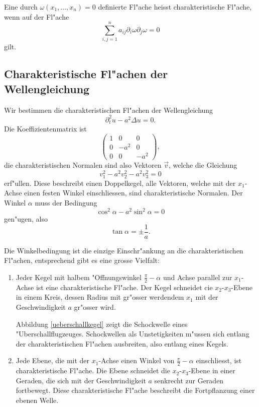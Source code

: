 \begin{definition}
Eine durch $\omega(x_1,\dots,x_n)=0$ definierte Fl"ache heisst
charakteristische Fl"ache, wenn auf der Fl"ache
\[
\sum_{i,j=1}^na_{ij}\partial_i\omega\partial_j\omega=0
\]
gilt.
\end{definition}

\subsection{Charakteristische Fl"achen der Wellengleichung}
Wir bestimmen die charakteristischen Fl"achen der
Wellengleichung
\[
\partial_t^2u-a^2\Delta u=0.
\]
Die Koeffizientenmatrix ist
\[
\begin{pmatrix}
1&0&0\\
0&-a^2&0\\
0&0&-a^2
\end{pmatrix},
\]
die charakteristischen Normalen sind also Vektoren $\vec v$, welche die
Gleichung
\[
v_1^2-a^2v_2^2-a^2v_3^2=0
\]
erf"ullen. Diese beschreibt einen Doppelkegel, alle Vektoren, welche mit
der $x_1$-Achse einen festen Winkel einschliessen, sind charakteristische
Normalen. Der Winkel $\alpha$ muss der Bedingung
\[
\cos^2\alpha-a^2\sin^2\alpha=0
\]
gen"ugen, also
\[
\tan\alpha=\pm\frac1a.
\]

Die Winkelbedingung ist die einzige Einschr"ankung an
die charakteristischen Fl"achen,  entsprechend gibt es eine
grosse Vielfalt:
\begin{enumerate}
\item
Jeder Kegel mit halbem "Offnungswinkel $\frac{\pi}2-\alpha$
und Achse parallel zur $x_1$-Achse ist eine charakteristische Fl"ache.
Der Kegel schneidet cie $x_2$-$x_3$-Ebene in einem Kreis, dessen Radius mit
gr"osser werdendem $x_1$ mit der Geschwindigkeit $a$ gr"osser wird.

Abbildung \ref{ueberschallkegel}
zeigt die Schockwelle eines "Uberschallflugzeuges. Schockwellen
als Unstetigkeiten m"ussen sich entlang der charakteristischen Fl"achen ausbreiten,
also entlang eines Kegels.
\item 
Jede Ebene, die mit der $x_1$-Achse einen Winkel von $\frac\pi2-\alpha$
einschliesst, ist charakteristische Fl"ache.
Die Ebene schneidet die $x_2$-$x_3$-Ebene in einer Geraden, die sich
mit der Geschwindigkeit $a$ senkrecht zur Geraden fortbewegt.
Diese charakteristische Fl"ache beschreibt die Fortpflanzung einer
ebenen Welle.
\end{enumerate}

